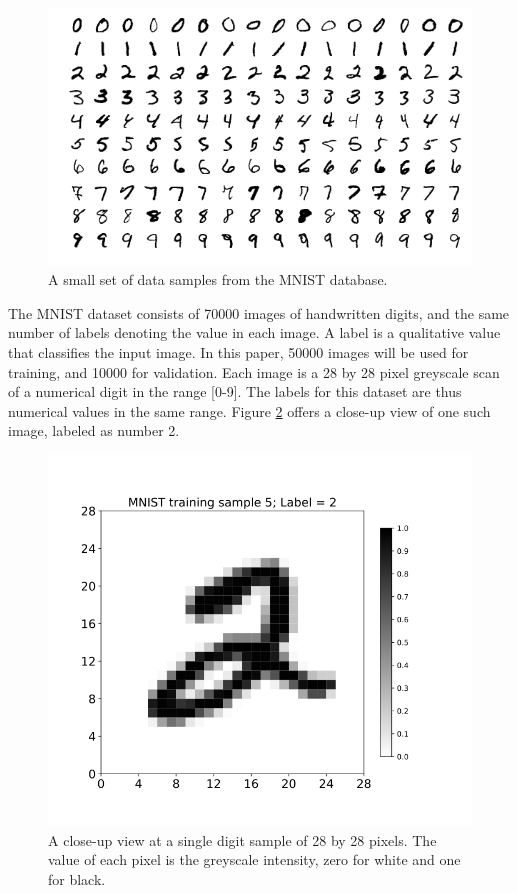 \documentclass[sigplan, review=false, screen=true, balance=true]{acmart}
\begin{document}
\begin{figure}[H]
  \centering
  \includegraphics[width=\columnwidth]{../figures/mnist_examples.png}
  \caption{A small set of data samples from the MNIST database.}
  \label{fig_mnist_examples}
\end{figure}

The MNIST dataset consists of 70000 images of handwritten digits, 
and the same number of labels denoting the value in each image. 
A label is a qualitative value that classifies the input image.
In this paper, 50000 images will be used for training, and 10000 for validation.
Each image is a 28 by 28 pixel greyscale scan of a numerical digit in the range [0-9]. 
The labels for this dataset are thus numerical values in the same range. 
Figure \ref{fig_mnist_example_digit} offers a close-up view of one such image,
labeled as number 2.

\begin{figure}[H]
  \centering
  \includegraphics[width=\columnwidth]{../figures/mnist_example_digit.png}
  \caption{A close-up view at a single digit sample of 28 by 28 pixels.
           The value of each pixel is the greyscale intensity, zero for white
           and one for black.}
  \label{fig_mnist_example_digit}
\end{figure}
\end{document}
